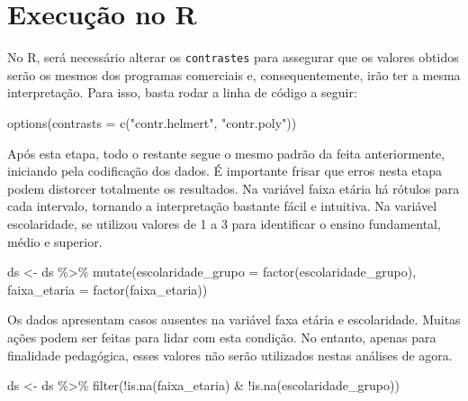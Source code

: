 \documentclass[
]{book}
\newenvironment{Shaded}{\begin{snugshade}}{\end{snugshade}}
\newcommand{\AttributeTok}[1]{\textcolor[rgb]{0.77,0.63,0.00}{#1}}
\newcommand{\FunctionTok}[1]{\textcolor[rgb]{0.00,0.00,0.00}{#1}}
\newcommand{\NormalTok}[1]{#1}
\newcommand{\OtherTok}[1]{\textcolor[rgb]{0.56,0.35,0.01}{#1}}
\newcommand{\SpecialCharTok}[1]{\textcolor[rgb]{0.00,0.00,0.00}{#1}}
\newcommand{\StringTok}[1]{\textcolor[rgb]{0.31,0.60,0.02}{#1}}
\begin{document}
\hypertarget{execuuxe7uxe3o-no-r-10}{%
\section{Execução no R}\label{execuuxe7uxe3o-no-r-10}}

No R, será necessário alterar os \texttt{contrastes} para assegurar que os valores obtidos serão os mesmos dos programas comerciais e, consequentemente, irão ter a mesma interpretação. Para isso, basta rodar a linha de código a seguir:

\begin{Shaded}
\begin{Highlighting}[]
\FunctionTok{options}\NormalTok{(}\AttributeTok{contrasts =} \FunctionTok{c}\NormalTok{(}\StringTok{"contr.helmert"}\NormalTok{, }\StringTok{"contr.poly"}\NormalTok{))}
\end{Highlighting}
\end{Shaded}

Após esta etapa, todo o restante segue o mesmo padrão da feita anteriormente, iniciando pela codificação dos dados. É importante frisar que erros nesta etapa podem distorcer totalmente os resultados. Na variável faixa etária há rótulos para cada intervalo, tornando a interpretação bastante fácil e intuitiva. Na variável escolaridade, se utilizou valores de 1 a 3 para identificar o ensino fundamental, médio e superior.

\begin{Shaded}
\begin{Highlighting}[]
\NormalTok{ds }\OtherTok{\textless{}{-}}\NormalTok{ ds }\SpecialCharTok{\%\textgreater{}\%} 
  \FunctionTok{mutate}\NormalTok{(}\AttributeTok{escolaridade\_grupo =} \FunctionTok{factor}\NormalTok{(escolaridade\_grupo),}
         \AttributeTok{faixa\_etaria =} \FunctionTok{factor}\NormalTok{(faixa\_etaria))}
\end{Highlighting}
\end{Shaded}

Os dados apresentam casos ausentes na variável faxa etária e escolaridade. Muitas ações podem ser feitas para lidar com esta condição. No entanto, apenas para finalidade pedagógica, esses valores não serão utilizados nestas análises de agora.

\begin{Shaded}
\begin{Highlighting}[]
\NormalTok{ds }\OtherTok{\textless{}{-}}\NormalTok{ ds }\SpecialCharTok{\%\textgreater{}\%} 
  \FunctionTok{filter}\NormalTok{(}\SpecialCharTok{!}\FunctionTok{is.na}\NormalTok{(faixa\_etaria) }\SpecialCharTok{\&} \SpecialCharTok{!}\FunctionTok{is.na}\NormalTok{(escolaridade\_grupo))}
\end{Highlighting}
\end{Shaded}
\end{document}
